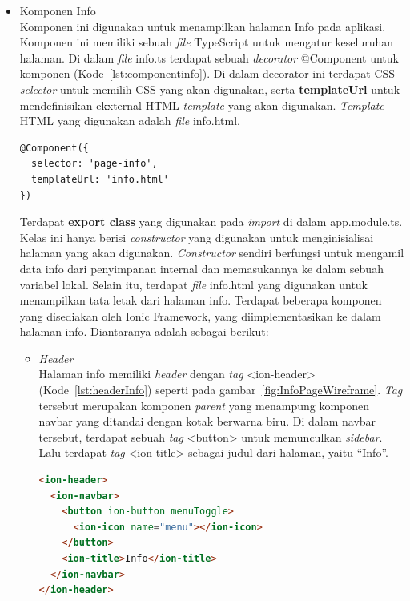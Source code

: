 \begin{itemize}
	\item Komponen Info \\
	Komponen ini digunakan untuk menampilkan halaman Info pada aplikasi. Komponen ini memiliki sebuah \textit{file} TypeScript untuk mengatur keseluruhan halaman. Di dalam \textit{file} info.ts terdapat sebuah \textit{decorator} @Component untuk komponen (Kode~\ref{lst:componentinfo}). Di dalam decorator ini terdapat CSS \textit{selector} untuk memilih CSS yang akan digunakan, serta \textbf{templateUrl} untuk mendefinisikan ekxternal HTML \textit{template} yang akan digunakan. \textit{Template} HTML yang digunakan adalah \textit{file} info.html. 
	
\begin{lstlisting}[language=html, label={lst:componentinfo}, caption=@Component pada info.ts]
@Component({
  selector: 'page-info',
  templateUrl: 'info.html'
})
\end{lstlisting} 

	Terdapat \textbf{export class} yang digunakan pada \textit{import} di dalam app.module.ts. Kelas ini hanya berisi \textit{constructor} yang digunakan untuk menginisialisai halaman yang akan digunakan. \textit{Constructor} sendiri berfungsi untuk mengamil data info dari penyimpanan internal dan memasukannya ke dalam sebuah variabel lokal.
	Selain itu, terdapat \textit{file} info.html yang digunakan untuk menampilkan tata letak dari halaman info. Terdapat beberapa komponen yang disediakan oleh Ionic Framework, yang diimplementasikan ke dalam halaman info. Diantaranya adalah sebagai berikut:
	
	\begin{itemize}
		\item \textit{Header} \\
		Halaman info memiliki \textit{header} dengan \textit{tag} <ion-header> (Kode~\ref{lst:headerInfo}) seperti pada gambar~\ref{fig:InfoPageWireframe}. \textit{Tag} tersebut merupakan komponen \textit{parent} yang menampung komponen navbar yang ditandai dengan kotak berwarna biru. Di dalam navbar tersebut, terdapat sebuah \textit{tag} <button> untuk memunculkan \textit{sidebar}. Lalu terdapat \textit{tag} <ion-title> sebagai judul dari halaman, yaitu ``Info''.
		\newpage
\begin{lstlisting}[language=html, label={lst:headerInfo}, caption=\textit{Header} pada info.html]
<ion-header>
  <ion-navbar>
    <button ion-button menuToggle>
      <ion-icon name="menu"></ion-icon>
    </button>
    <ion-title>Info</ion-title>
  </ion-navbar>
</ion-header>
\end{lstlisting} 


\end{itemize}
\end{itemize}
